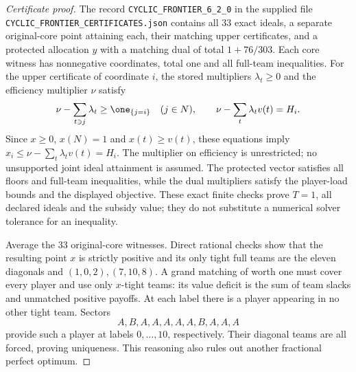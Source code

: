 \begin{proof}[Certificate proof]
The record \texttt{CYCLIC\_FRONTIER\_6\_2\_0} in the supplied file
\texttt{CYCLIC\_FRONTIER\_CERTIFICATES.json} contains all $33$ exact
ideals, a separate original-core point attaining each, their matching
upper certificates, and a protected allocation $y$ with a matching dual
of total $1+76/303$. Each core witness has nonnegative coordinates,
total one and all full-team inequalities. For the upper certificate of coordinate $i$, the stored multipliers
$\lambda_t\ge0$ and the efficiency multiplier $\nu$ satisfy
\[
 \nu-\sum_{t\ni j}\lambda_t\ge\one_{\{j=i\}}
 \quad(j\in N),\qquad
 \nu-\sum_t\lambda_tv(t)=H_i.
\]
Since $x\ge0$, $x(N)=1$ and $x(t)\ge v(t)$, these equations imply
$x_i\le\nu-\sum_t\lambda_tv(t)=H_i$. The multiplier on efficiency
is unrestricted; no unsupported joint ideal attainment is assumed. The protected vector satisfies all
floors and full-team inequalities, while the dual multipliers satisfy
the player-load bounds and the displayed objective. These exact finite
checks prove $T=1$, all declared ideals and the subsidy value; they do
not substitute a numerical solver tolerance for an inequality.

Average the $33$ original-core witnesses. Direct rational checks show
that the resulting point $x$ is strictly positive and its only tight
full teams are the eleven diagonals and $(1,0,2),(7,10,8)$.
A grand matching of worth one must cover every player and use only
$x$-tight teams: its value deficit is the sum of team slacks and
unmatched positive payoffs. At each label there is a player appearing
in no other tight team. Sectors
\[
                       A,B,A,A,A,A,A,B,A,A,A
\]
provide such a player at labels $0,\ldots,10$, respectively.
Their diagonal teams are all forced, proving uniqueness. This reasoning
also rules out another fractional perfect optimum.


\end{proof}
